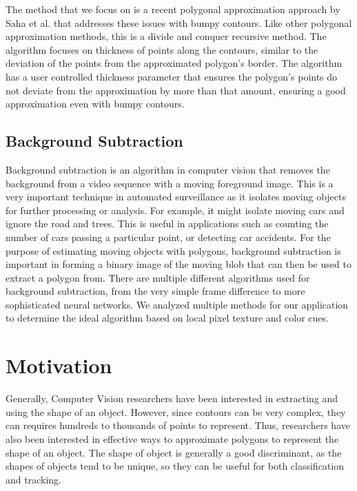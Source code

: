 \documentclass[10pt,twocolumn,letterpaper]{article}
\begin{document}
The method that we focus on is a recent polygonal approximation approach by Saha et al. \cite{Saha2017} that addresses
these issues with bumpy contours. Like other polygonal approximation methods, this is a divide and conquer recursive
method. The algorithm focuses on thickness of points along the contours, similar to the deviation of the points from the
approximated polygon's border. The algorithm has a user controlled thickness parameter that ensures the polygon's points
do not deviate from the approximation by more than that amount, ensuring a good approximation even with bumpy contours.

\subsection{Background Subtraction}

Background subtraction is an algorithm in computer vision that removes the background from a video sequence with a
moving foreground image. This is a very important technique in automated surveillance as it isolates moving objects for
further processing or analysis. For example, it might isolate moving cars and ignore the road and trees. This is useful
in applications such as counting the number of cars passing a particular point, or detecting car accidents. For the
purpose of estimating moving objects with polygons, background subtraction is important in forming a binary image of the
moving blob that can then be used to extract a polygon from. There are multiple different algorithms used for background
subtraction, from the very simple frame difference to more sophisticated neural networks. We analyzed multiple methods
for our application to determine the ideal algorithm based on local pixel texture and color cues.

\section{Motivation}

Generally, Computer Vision researchers have been interested in extracting and using the shape of an object. However,
since contours can be very complex, they can requires hundreds to thousands of points to represent. Thus, researchers
have also been interested in effective ways to approximate polygons to represent the shape of an object. The shape of
object is generally a good discriminant, as the shapes of objects tend to be unique, so they can be useful for both
classification and tracking.
\end{document}
